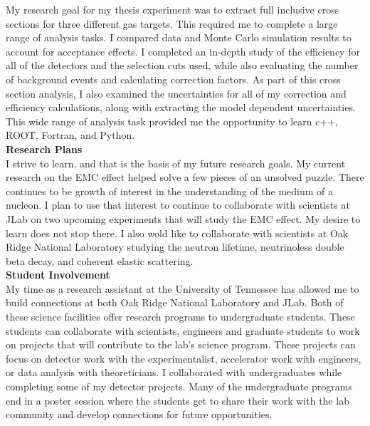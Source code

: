 \documentclass[12pt,letterpaper]{article}
\begin{document}
\indent My research goal for my thesis experiment was to extract full inclusive cross sections for three different gas targets. This required me to complete a large range of analysis tasks. I compared data and Monte Carlo simulation results to account for acceptance effects. I completed an in-depth study of the efficiency for all of the detectors and the selection cuts used, while also evaluating the number of background events and calculating correction factors. As part of this cross section analysis, I also examined the uncertainties for all of my correction and efficiency calculations, along with extracting the model dependent uncertainties. This wide range of analysis task provided me the opportunity to learn c++, ROOT, Fortran, and Python.\\

\noindent\textbf{Research Plans}\\
\indent I strive to learn, and that is the basis of my future research goals. My current research on the EMC effect helped solve a few pieces of an unsolved puzzle. There continues to be growth of interest in the understanding of the medium of a nucleon. I plan to use that interest to continue to collaborate with scientists at JLab on two upcoming experiments that will study the EMC effect. My desire to learn does not stop there. I also wold like to collaborate with scientists at Oak Ridge National Laboratory studying the neutron lifetime, neutrinoless double beta decay, and coherent elastic scattering.\\

\noindent\textbf{Student Involvement}\\
\indent My time as a research assistant at the University of Tennessee has allowed me to build connections at both Oak Ridge National Laboratory and JLab.  Both of these science facilities offer research programs to undergraduate students. These students can collaborate with scientists, engineers and graduate students to work on projects that will contribute to the lab's science program. These projects can focus on detector work with the experimentalist, accelerator work with engineers, or data analysis with theoreticians. I collaborated with undergraduates while completing some of my detector projects. Many of the undergraduate programs end in a poster session where the students get to share their work with the lab community and develop connections for future opportunities.
\end{document}
